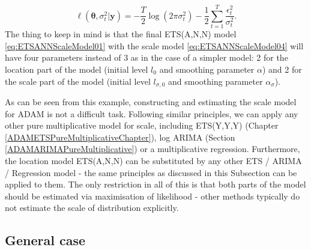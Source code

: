 \documentclass[
]{book}
\theoremstyle{definition}
\theoremstyle{definition}
\theoremstyle{definition}
\theoremstyle{definition}
\theoremstyle{remark}
\begin{document}
\begin{equation}
    \ell(\boldsymbol{\theta}, {\sigma}_t^2 | \mathbf{y}) = -\frac{T}{2} \log(2 \pi \sigma_t^2) -\frac{1}{2} \sum_{t=1}^T \frac{\epsilon_t^2}{\sigma_t^2} .
  \label{eq:ETSANNScaleModelLogLik}
\end{equation}
The thing to keep in mind is that the final ETS(A,N,N) model \eqref{eq:ETSANNScaleModel01} with the scale model \eqref{eq:ETSANNScaleModel04} will have four parameters instead of 3 as in the case of a simpler model: 2 for the location part of the model (initial level \(l_{0}\) and smoothing parameter \(\alpha\)) and 2 for the scale part of the model (initial level \(l_{\sigma,0}\) and smoothing parameter \(\alpha_\sigma\)).

As can be seen from this example, constructing and estimating the scale model for ADAM is not a difficult task. Following similar principles, we can apply any other pure multiplicative model for scale, including ETS(Y,Y,Y) (Chapter \ref{ADAMETSPureMultiplicativeChapter}), log ARIMA (Section \ref{ADAMARIMAPureMultiplicative}) or a multiplicative regression. Furthermore, the location model ETS(A,N,N) can be substituted by any other ETS / ARIMA / Regression model - the same principles as discussed in this Subsection can be applied to them. The only restriction in all of this is that both parts of the model should be estimated via maximisation of likelihood - other methods typically do not estimate the scale of distribution explicitly.

\hypertarget{general-case}{%
\subsection{General case}\label{general-case}}
\end{document}
